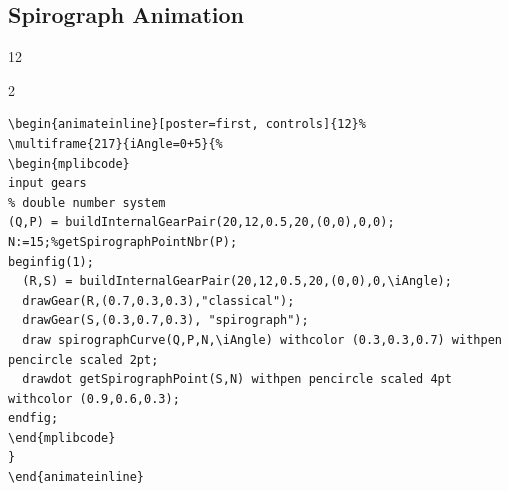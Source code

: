 \documentclass[english]{ltxdoc}
\begin{document}
\begin{landscape}
\subsection{Spirograph Animation}

\begin{center}
\begin{animateinline}[poster=first, controls]{12}%
\end{animateinline}

\end{center}
\begin{multicols}{2}
  \begin{lstlisting}
\begin{animateinline}[poster=first, controls]{12}%
\multiframe{217}{iAngle=0+5}{%
\begin{mplibcode}
input gears
% double number system
(Q,P) = buildInternalGearPair(20,12,0.5,20,(0,0),0,0);
N:=15;%getSpirographPointNbr(P);
beginfig(1);
  (R,S) = buildInternalGearPair(20,12,0.5,20,(0,0),0,\iAngle);
  drawGear(R,(0.7,0.3,0.3),"classical");
  drawGear(S,(0.3,0.7,0.3), "spirograph");
  draw spirographCurve(Q,P,N,\iAngle) withcolor (0.3,0.3,0.7) withpen pencircle scaled 2pt;
  drawdot getSpirographPoint(S,N) withpen pencircle scaled 4pt withcolor (0.9,0.6,0.3);
endfig;
\end{mplibcode}
}
\end{animateinline}
  \end{lstlisting}
\end{multicols}
\end{landscape}

\printbibliography
\printindex
\end{document}
